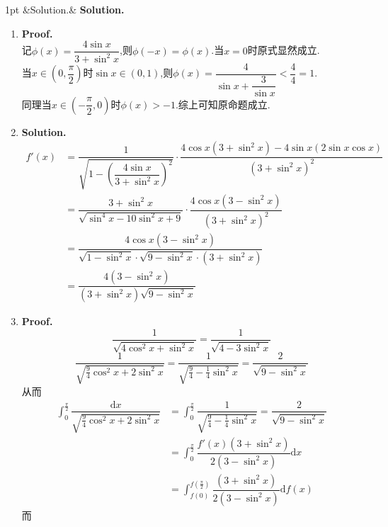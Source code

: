 \documentclass{ctexart}
\newcommand{\di}{\mathrm{d}}
\newcommand{\dx}{\di x}
\newenvironment{solution}[1][]{%
\def\FrameCommand{%
\hspace{1pt}%
{\color{solutionline}\vrule width 2pt}%
{\color{solutionshade}\vrule width 4pt}%
\colorbox{solutionshade}%
}%
\MakeFramed{\advance\hsize-\width\FrameRestore}%
\noindent\hspace{-4.55pt}%
\begin{adjustwidth}{}{1pt}%
\setlength{\parindent}{0pt}%
\vspace{3pt}%
\ifx&#1&\else %
    \textbf{#1}\par\vspace{1pt}%
\fi
}
{%
\vspace{2pt}%
\end{adjustwidth}\endMakeFramed%
}
\begin{document}
\begin{solution}[Solution.]
    \begin{enumerate}[label=\textbf{(\arabic*)}]
        \item \textbf{Proof.}\\
            记$\phi(x)=\dfrac{4\sin x}{3+\sin^2 x}$,则$\phi(-x)=\phi(x)$.当$x=0$时原式显然成立.\\
            当$x\in\left(0,\dfrac{\pi}{2}\right)$时$\sin x\in(0,1)$,则$\phi(x)=\dfrac{4}{\sin{x}+\dfrac{3}{\sin x}}<\dfrac{4}{4}=1$.\\
            同理当$x\in\left(-\dfrac{\pi}{2},0\right)$时$\phi(x)>-1$.综上可知原命题成立.
        \item \textbf{Solution.}\\
            \begin{align*}
                f'(x)
                &= \dfrac{1}{\sqrt{1-\left(\dfrac{4\sin x}{3+\sin^2 x}\right)^2}}\cdot\dfrac{4\cos x\left(3+\sin^2 x\right)-4\sin x\left(2\sin x\cos x\right)}{\left(3+\sin^2 x\right)^2} \\
                &= \dfrac{3+\sin^2 x}{\sqrt{\sin^4 x-10\sin^2 x+9}}\cdot\dfrac{4\cos x\left(3-\sin^2 x\right)}{\left(3+\sin^2 x\right)^2} \\
                &= \dfrac{4\cos x\left(3-\sin^2 x\right)}{\sqrt{1-\sin^2 x}\cdot\sqrt{9-\sin^2 x}\cdot\left(3+\sin^2 x\right)} \\
                &= \dfrac{4\left(3-\sin^2 x\right)}{\left(3+\sin^2 x\right)\sqrt{9-\sin^2 x}}
            \end{align*}
        \item \textbf{Proof.}
            $$\dfrac{1}{\sqrt{4\cos^2 x+\sin^2 x}}=\dfrac{1}{\sqrt{4-3\sin^2 x}}$$
            $$\dfrac{1}{\sqrt{\frac{9}{4}\cos^2 x+2\sin^2 x}}=\dfrac{1}{\sqrt{\frac{9}{4}-\frac{1}{4}\sin^2 x}}=\dfrac{2}{\sqrt{9-\sin^2 x}}$$
            从而\begin{align*}
                \int_{0}^{\frac{\pi}{2}}{\dfrac{\dx}{\sqrt{\frac{9}{4}\cos^2{x}+2\sin^2{x}}}}
                &= \int_{0}^{\frac{\pi}{2}}\dfrac{1}{\sqrt{\frac{9}{4}-\frac{1}{4}\sin^2 x}}=\dfrac{2}{\sqrt{9-\sin^2 x}} \\
                &= \int_{0}^{\frac{\pi}{2}}\dfrac{f'(x)\left(3+\sin^2 x\right)}{2\left(3-\sin^2 x\right)}\dx\\
                &= \int_{f(0)}^{f\left(\frac{\pi}{2}\right)}\dfrac{\left(3+\sin^2 x\right)}{2\left(3-\sin^2 x\right)}\di f(x)
            \end{align*}
            而\begin{align*}

\end{align*}
\end{enumerate}
\end{solution}
\end{document}
